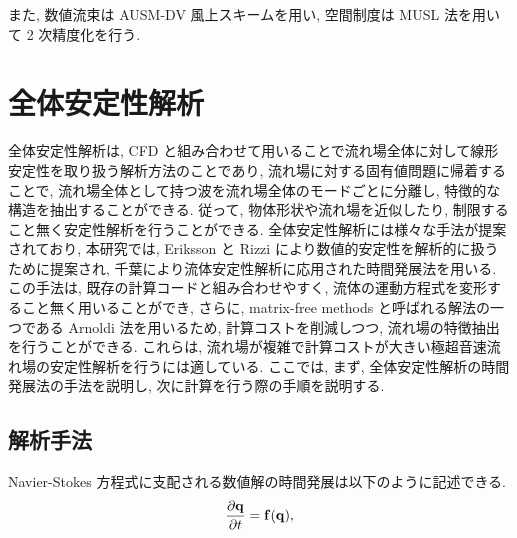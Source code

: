また,
数値流束は AUSM-DV 風上スキーム\cite{ausmdv}を用い,
空間制度は MUSL 法\cite{musl}を用いて 2 次精度化を行う.

\section{全体安定性解析}

全体安定性解析は,
CFD と組み合わせて用いることで流れ場全体に対して線形安定性を取り扱う解析方法のことであり,
流れ場に対する固有値問題に帰着することで,
流れ場全体として持つ波を流れ場全体のモードごとに分離し,
特徴的な構造を抽出することができる.
従って,
物体形状や流れ場を近似したり,
制限すること無く安定性解析を行うことができる.
全体安定性解析には様々な手法が提案されており,
本研究では,
Eriksson と Rizzi により数値的安定性を解析的に扱うために提案され,
千葉により流体安定性解析に応用された時間発展法を用いる.
この手法は,
既存の計算コードと組み合わせやすく,
流体の運動方程式を変形すること無く用いることができ,
さらに,
matrix-free methods と呼ばれる解法の一つである Arnoldi 法を用いるため,
計算コストを削減しつつ,
流れ場の特徴抽出を行うことができる.
これらは,
流れ場が複雑で計算コストが大きい極超音速流れ場の安定性解析を行うには適している.
ここでは,
まず,
全体安定性解析の時間発展法の手法を説明し,
次に計算を行う際の手順を説明する.

\subsection*{解析手法}

Navier-Stokes 方程式に支配される数値解の時間発展は以下のように記述できる.
\begin{equation}
  \frac{\partial {\bf q}}{\partial t} = {\bf f}({\bf q}), 
\label{governingeq}
\end{equation}

